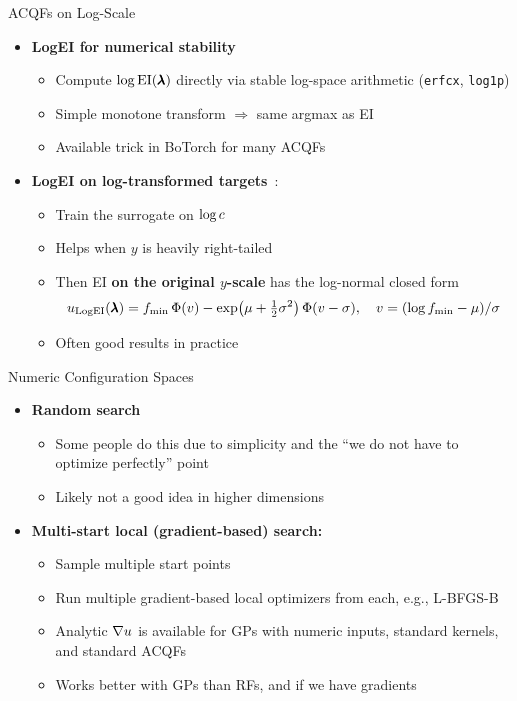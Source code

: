 \documentclass[main]{subfiles}
\begin{document}
\begin{frame}[t]{ACQFs on Log-Scale}
  \begin{itemize}
    \item \textbf{LogEI for numerical stability}~    
    \begin{itemize}
    \item Compute $\log\mathrm{EI}(\pmb{\lambda})$ directly via stable log-space arithmetic (\texttt{erfcx}, \texttt{log1p})
    \item Simple monotone transform $\Rightarrow$ same argmax as EI
    \item Available trick in BoTorch for many ACQFs
    \end{itemize}
      \item \textbf{LogEI on log-transformed targets}~: 
      \begin{itemize}
        \item Train the surrogate on $\log c$
        \item Helps when $y$ is heavily right-tailed
        \item Then EI \textbf{on the original $y$-scale} has the log-normal closed form
    $$u_{\mathrm{LogEI}}(\pmb{\lambda}) = f_{\min}\,\Phi(v) - \exp\!\big(\mu + \tfrac{1}{2}\sigma^2\big)\,\Phi(v - \sigma), \quad v = (\log f_{\min} - \mu)/\sigma$$
    \item Often good results in practice
  \end{itemize}
  \end{itemize}
\end{frame}


\begin{frame}[t]{Numeric Configuration Spaces}
\begin{itemize}
\item \textbf{Random search}
\begin{itemize}
\item Some people do this due to simplicity and the ``we do not have to optimize perfectly'' point
\item Likely not a good idea in higher dimensions
\end{itemize}
\item \textbf{Multi-start local (gradient-based) search:}
\begin{itemize}
\item Sample multiple start points
\item Run multiple gradient-based local optimizers from each, e.g., L-BFGS-B 
\item Analytic $\nabla u$ is available for GPs with numeric inputs, standard kernels, and standard ACQFs
\item Works better with GPs than RFs, and if we have gradients
\end{itemize}
\end{itemize}
\end{frame}
\end{document}
